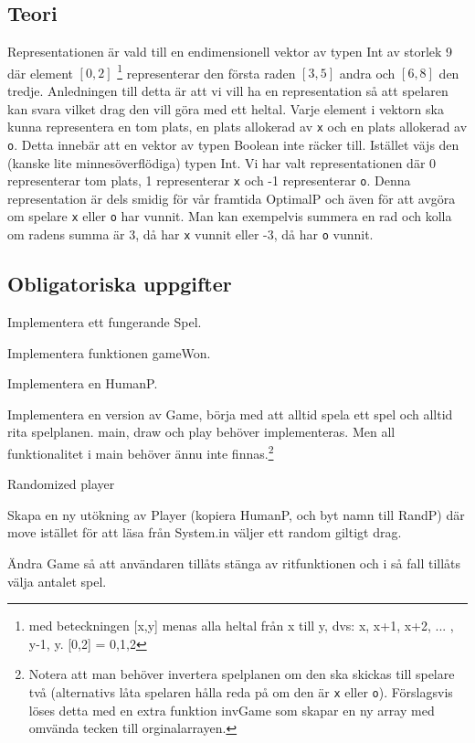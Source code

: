 \subsection{Teori}
Representationen är vald till en endimensionell vektor av typen Int av storlek 9 där element $[0,2]$ \footnote{med beteckningen [x,y] menas alla heltal från x till y, dvs: x, x+1, x+2, ... , y-1, y. [0,2] = {0,1,2}} representerar den första raden $[3,5]$ andra och $[6,8]$ den tredje. Anledningen till detta är att vi vill ha en representation så att spelaren kan svara vilket drag den vill göra med ett heltal.
Varje element i vektorn ska kunna representera en tom plats, en plats allokerad av \texttt{x} och en plats allokerad av \texttt{o}. Detta innebär att en vektor av typen Boolean inte räcker till. Istället väjs den (kanske lite minnesöverflödiga) typen Int. Vi har valt representationen där 0 representerar tom plats, 1 representerar \texttt{x} och -1 representerar \texttt{o}. Denna representation är dels smidig för vår framtida OptimalP och även för att avgöra om spelare \texttt{x} eller \texttt{o} har vunnit. Man kan exempelvis summera en rad och kolla om radens summa är 3, då har \texttt{x} vunnit eller -3, då har \texttt{o} vunnit.
 
\subsection{Obligatoriska uppgifter}

\Task Implementera ett fungerande Spel.

\Subtask Implementera funktionen gameWon.

\Subtask Implementera en HumanP.

\Subtask Implementera en version av Game, börja med att alltid spela ett spel och alltid rita spelplanen. main, draw och play behöver implementeras. Men all funktionalitet i main behöver ännu inte finnas.\footnote{Notera att man behöver invertera spelplanen om den ska skickas till spelare två (alternativs låta spelaren hålla reda på om den är \texttt{x} eller \texttt{o}). Förslagsvis löses detta med en extra funktion invGame som skapar en ny array med omvända tecken till orginalarrayen.}

\Task Randomized player

\Subtask Skapa en ny utökning av Player (kopiera HumanP, och byt namn till RandP) där move istället för att läsa från System.in väljer ett random giltigt drag.

\Subtask Ändra Game så att användaren tillåts stänga av ritfunktionen och i så fall tillåts välja antalet spel.

